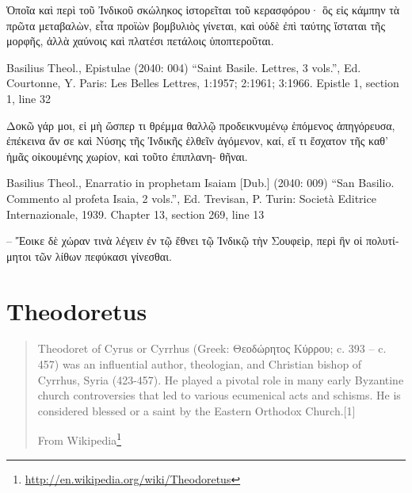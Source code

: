 \documentclass[12pt,letterpaper,twoside,final]{memoir}
\begin{document}
\begin{greek}
       Ὁποῖα καὶ περὶ τοῦ Ἰνδικοῦ σκώληκος ἱστορεῖται 
τοῦ κερασφόρου· ὃς εἰς κάμπην τὰ πρῶτα μεταβαλὼν, εἶτα 
προϊὼν βομβυλιὸς γίνεται, καὶ οὐδὲ ἐπὶ ταύτης ἵσταται τῆς 
μορφῆς, ἀλλὰ χαύνοις καὶ πλατέσι πετάλοις ὑποπτεροῦται. 



Basilius Theol., Epistulae (2040: 004)
“Saint Basile. Lettres, 3 vols.”, Ed. Courtonne, Y.
Paris: Les Belles Lettres, 1:1957; 2:1961; 3:1966.
Epistle 1, section 1, line 32

         Δοκῶ γάρ μοι, εἰ μὴ ὥσπερ τι θρέμμα θαλλῷ 
προδεικνυμένῳ ἑπόμενος ἀπηγόρευσα, ἐπέκεινα ἄν σε καὶ 
Νύσης τῆς Ἰνδικῆς ἐλθεῖν ἀγόμενον, καί, εἴ τι ἔσχατον 
τῆς καθ' ἡμᾶς οἰκουμένης χωρίον, καὶ τοῦτο ἐπιπλανη-
θῆναι. 



Basilius Theol., Enarratio in prophetam Isaiam [Dub.] (2040: 009)
“San Basilio. Commento al profeta Isaia, 2 vols.”, Ed. Trevisan, P.
Turin: Società Editrice Internazionale, 1939.
Chapter 13, section 269, line 13

                                                          – Ἔοικε 
δὲ χώραν τινὰ λέγειν ἐν τῷ ἔθνει τῷ Ἰνδικῷ τὴν Σουφεὶρ, 
περὶ ἣν οἱ πολυτίμητοι τῶν λίθων πεφύκασι γίνεσθαι. 

\end{greek}

\section{Theodoretus}

\blockquote[From Wikipedia\footnote{\url{http://en.wikipedia.org/wiki/Theodoretus}}]{Theodoret of Cyrus or Cyrrhus (Greek: Θεοδώρητος Κύρρου; c. 393 – c. 457) was an influential author, theologian, and Christian bishop of Cyrrhus, Syria (423-457). He played a pivotal role in many early Byzantine church controversies that led to various ecumenical acts and schisms. He is considered blessed or a saint by the Eastern Orthodox Church.[1]}
\end{document}
